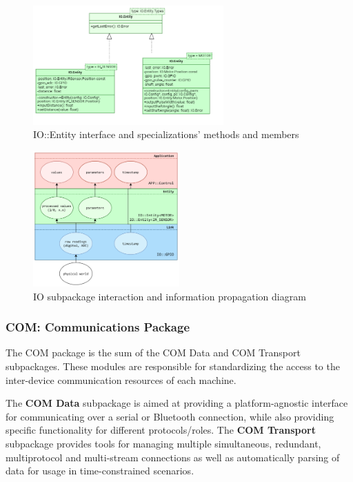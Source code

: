 \begin{figure}[H]
	\centering
	\includegraphics[width=0.65\textwidth]{./img/navig-class-entity.png}
	\caption {IO::Entity interface and specializations' methods and members}
	\label{fig:navig-class-entity}
	\end{figure}



\begin{figure}[H]
	\centering
	\includegraphics[width=0.5\textwidth]{./img/module-stack-io.png}
	\caption {IO subpackage interaction and information propagation diagram}
	\label{fig:navig-module-stack-io}
	\end{figure}

 

\subsubsection{COM: Communications Package}

The COM package is the sum of the COM Data and COM Transport subpackages. These  modules are responsible for standardizing the access to the inter-device communication resources of each machine. 


The \textbf{COM Data} subpackage is aimed at providing a platform-agnostic interface for communicating over a serial or Bluetooth connection, while also providing specific functionality for different protocols/roles.
The \textbf{COM Transport} subpackage provides tools for managing multiple simultaneous, redundant, multiprotocol and multi-stream connections as well as automatically parsing of data for usage in time-constrained scenarios.

